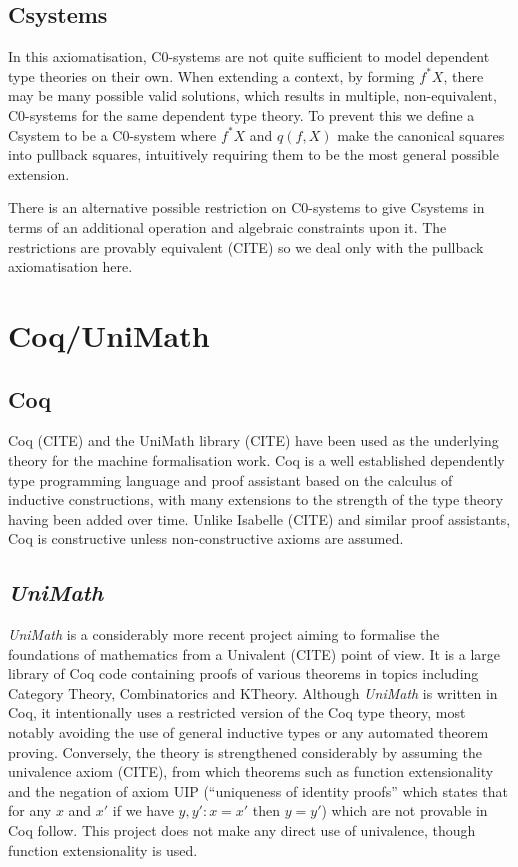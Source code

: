 \subsection{Csystems}
In this axiomatisation, C0-systems are not quite sufficient to model dependent
type theories on their own. When extending a context, by forming $f^*X$, there
may be many possible valid solutions, which results in multiple, non-equivalent,
C0-systems for the same dependent type theory. To prevent this we define a
Csystem to be a C0-system where $f^*X$ and $q(f, X)$ make the canonical squares
into pullback squares, intuitively requiring them to be the most general
possible extension.

There is an alternative possible restriction on C0-systems to give Csystems in
terms of an additional operation and algebraic constraints upon it. The
restrictions are provably equivalent (CITE) so we deal only with the pullback
axiomatisation here.

\section{Coq/UniMath}
\subsection{Coq}
Coq (CITE) and the UniMath library (CITE) have been used as the underlying
theory for the machine formalisation work. Coq is a well established dependently
type programming language and proof assistant based on the calculus of inductive
constructions, with many extensions to the strength of the type theory having
been added over time. Unlike Isabelle (CITE) and similar proof assistants, Coq
is constructive unless non-constructive axioms are assumed.

\subsection{\textit{UniMath}}
\textit{UniMath} is a considerably more recent project aiming to formalise the
foundations of mathematics from a Univalent (CITE) point of view. It is a large
library of Coq code containing proofs of various theorems in topics including
Category Theory, Combinatorics and KTheory. Although \textit{UniMath} is written
in Coq, it intentionally uses a restricted version of the Coq type theory, most
notably avoiding the use of general inductive types or any automated theorem
proving. Conversely, the theory is strengthened considerably by assuming the
univalence axiom (CITE), from which theorems such as function extensionality and
the negation of axiom UIP (``uniqueness of identity proofs'' which states that
for any $x$ and $x'$ if we have $y, y' : x=x'$ then $y=y'$) which are not
provable in Coq follow. This project does not make any direct use of univalence,
though function extensionality is used.

